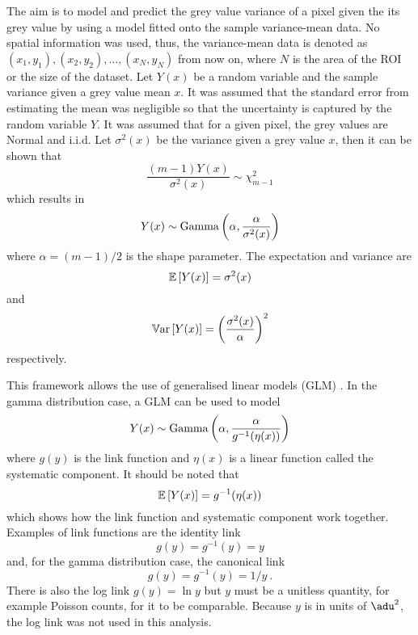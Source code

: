 The aim is to model and predict the grey value variance of a pixel given the its grey value by using a model fitted onto the sample variance-mean data. No spatial information was used, thus, the variance-mean data is denoted as $(x_1,y_1),(x_2,y_2),\dotsc,(x_N,y_N)$ from now on, where $N$ is the area of the ROI or the size of the dataset. Let $Y(x)$ be a random variable and the sample variance given a grey value mean $x$. It was assumed that the standard error from estimating the mean was negligible so that the uncertainty is captured by the random variable $Y$. It was assumed that for a given pixel, the grey values are Normal and i.i.d. Let $\sigma^2(x)$ be the variance given a grey value $x$, then it can be shown that
\begin{equation}
\dfrac{(m-1)Y(x)}{\sigma^2(x)}\sim\chi^2_{m-1}
\end{equation}
which results in
\begin{equation}
Y(x)\sim\operatorname{Gamma}\left(\alpha,\dfrac{\alpha}{\sigma^2(x)}\right)
\end{equation}
where $\alpha=(m-1)/2$ is the shape parameter. The expectation and variance are
\begin{equation}
\operatorname{\mathbb{E}}\left[Y(x)\right]=\sigma^2(x)
\end{equation}
and
\begin{equation}
\operatorname{\mathbb{V}ar}\left[Y(x)\right]=\left(\dfrac{\sigma^2(x)}{\alpha}\right)^2
\end{equation}
respectively.

This framework allows the use of generalised linear models (GLM) \citep{nelder1972generalized,nelder1972generalized_2, mccullagh1984generalized}. In the gamma distribution case, a GLM can be used to model
\begin{equation}
Y(x)\sim\operatorname{Gamma}\left(\alpha,\dfrac{\alpha}{g^{-1}(\eta(x))}\right)
\end{equation}
where $g(y)$ is the link function and $\eta(x)$ is a linear function called the systematic component. It should be noted that
\begin{equation}
  \operatorname{\mathbb{E}}\left[Y(x)\right]=g^{-1}(\eta(x))
\end{equation}
which shows how the link function and systematic component work together. Examples of link functions are the identity link
\begin{equation}
g(y)=g^{-1}(y)=y
\end{equation}
and, for the gamma distribution case, the canonical link
\begin{equation}
g(y)=g^{-1}(y)=1/y \ .
\end{equation}
There is also the log link $g(y)=\ln y$ but $y$ must be a unitless quantity, for example Poisson counts, for it to be comparable. Because $y$ is in units of $\SI{}{\adu^2}$, the log link was not used in this analysis.

